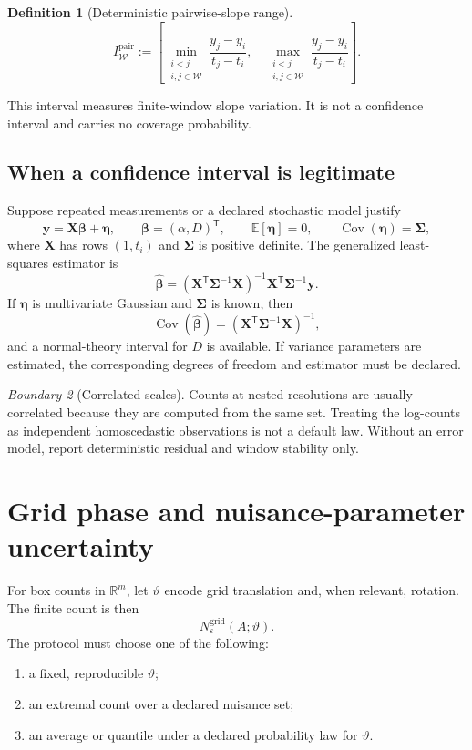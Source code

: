 \documentclass[11pt,a4paper]{article}
\theoremstyle{definition}
\newtheorem{definition}{Definition}[section]
\theoremstyle{plain}
\theoremstyle{remark}
\newtheorem{warning}[definition]{Boundary}
\newcommand{\R}{\mathbb{R}}
\newcommand{\Wcal}{\mathcal{W}}
\newcommand{\Cov}{\operatorname{Cov}}
\begin{document}
\begin{definition}[Deterministic pairwise-slope range]
\[
I_{\Wcal}^{\mathrm{pair}}
:=
\left[
\min_{\substack{i<j\\i,j\in\Wcal}}
\frac{y_j-y_i}{t_j-t_i},
\quad
\max_{\substack{i<j\\i,j\in\Wcal}}
\frac{y_j-y_i}{t_j-t_i}
\right].
\]
\end{definition}

This interval measures finite-window slope variation. It is not a
confidence interval and carries no coverage probability.

\subsection{When a confidence interval is legitimate}

Suppose repeated measurements or a declared stochastic model justify
\[
\bm y=\mathbf X\bm\beta+\bm\eta,
\qquad
\bm\beta=(\alpha,D)^\mathsf T,
\qquad
\mathbb E[\bm\eta]=0,
\qquad
\Cov(\bm\eta)=\bm\Sigma,
\]
where $\mathbf X$ has rows $(1,t_i)$ and $\bm\Sigma$ is positive
definite. The generalized least-squares estimator is
\[
\widehat{\bm\beta}
=
(\mathbf X^\mathsf T\bm\Sigma^{-1}\mathbf X)^{-1}
\mathbf X^\mathsf T\bm\Sigma^{-1}\bm y.
\]
If $\bm\eta$ is multivariate Gaussian and $\bm\Sigma$ is known, then
\[
\Cov(\widehat{\bm\beta})
=
(\mathbf X^\mathsf T\bm\Sigma^{-1}\mathbf X)^{-1},
\]
and a normal-theory interval for $D$ is available. If variance parameters
are estimated, the corresponding degrees of freedom and estimator must be
declared.

\begin{warning}[Correlated scales]
Counts at nested resolutions are usually correlated because they are
computed from the same set. Treating the log-counts as independent
homoscedastic observations is not a default law. Without an error model,
report deterministic residual and window stability only.
\end{warning}

\section{Grid phase and nuisance-parameter uncertainty}

For box counts in $\R^m$, let $\vartheta$ encode grid translation and,
when relevant, rotation. The finite count is then
\[
N_\varepsilon^{\mathrm{grid}}(A;\vartheta).
\]
The protocol must choose one of the following:
\begin{enumerate}[label=(\alph*)]
\item a fixed, reproducible $\vartheta$;
\item an extremal count over a declared nuisance set;
\item an average or quantile under a declared probability law for
      $\vartheta$.
\end{enumerate}
\end{document}
